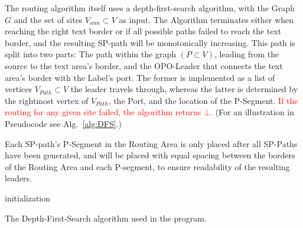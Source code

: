 \documentclass[11pt,a4paper]{vutinfth}
\newcommand{\change}[1]{\textcolor{red}{#1}}
\begin{document}
The routing algorithm itself uses a depth-first-search algorithm, with the Graph $G$ and the set of sites $V_{ann} \subset V$ as input. The Algorithm terminates either when reaching the right text border or if all possible paths failed to reach the text border, and the resulting SP-path will be monotonically increasing. This path is split into two parts: The path within the graph $(P \subset V)$, leading from the source to the text area's border, and the OPO-Leader that connects the text area's border with the Label's port. The former is implemented as a list of vertices $V_{Path} \subset V$ the leader travels through, whereas the latter is determined by the rightmost vertex of $V_{Path}$, the Port, and the location of the P-Segment. \change{If the routing for any given site failed, the algorithm returns $\bot$.} (For an illustration in Pseudocode see Alg.~\ref{alg:DFS}.)

Each SP-path's P-Segment in the Routing Area is only placed after all SP-Paths have been generated, and will be placed with equal spacing between the borders of the Routing Area and each P-segment, to ensure readability of the resulting leaders.

\begin{algorithm}

\DontPrintSemicolon
{}



initialization\;
\caption{The Depth-First-Search algorithm used in the program.}
\label{alg:DFS}
\end{algorithm}
\end{document}
